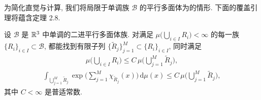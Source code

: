 为简化直觉与计算, 我们将局限于单调族 $\mathcal{B}$ 的平行多面体为的情形. 下面的覆盖引理将蕴含定理 2.8.

\begin{lemma}\label{lem:2.10}
设 $\mathcal{B}$ 是 $\mathbb{R}^3$ 中单调的二进平行多面体族. 对满足 $\mu\bigl(\bigcup_{i\in I} R_i\bigr) < \infty$ 的每一族 $\{R_i\}_{i\in I} \subset \mathcal{B}$, 都能找到有限子列 $\{\tilde{R}_j\}_{j=1}^M \subset \{R_i\}_{i\in I}$, 同时满足
\begin{align*}
  \mu\Big(\bigcup_{i\in I}R_{i}\Big)\leq C\,\mu\Big(\bigcup_{j=1}^{M}\tilde{R}_{j}\Big),
\end{align*}
\begin{align*}
  \int_{\bigcup_{j=1}^{M}\tilde{R}_{j}}\exp\Big(\sum_{j=1}^{M}\chi_{\tilde{R}_{j}}(x)\Big)\,\mathrm{d}\mu(x)
  \leq C\,\mu\Big(\bigcup_{j=1}^{M}\tilde{R}_{j}\Big),
\end{align*}
其中 $C < \infty$ 是普适常数.
\end{lemma}

